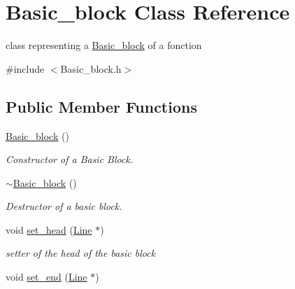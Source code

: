 \hypertarget{class_basic__block}{\section{Basic\+\_\+block Class Reference}
\label{class_basic__block}
}


class representing a \hyperlink{class_basic__block}{Basic\+\_\+block} of a fonction  




{\ttfamily \#include $<$Basic\+\_\+block.\+h$>$}

\subsection*{Public Member Functions}
\begin{DoxyCompactItemize}
\item 
\hypertarget{class_basic__block_aa2455e1b1b8f5ac9b1c128f121fe3d67}{\hyperlink{class_basic__block_aa2455e1b1b8f5ac9b1c128f121fe3d67}{Basic\+\_\+block} ()}\label{class_basic__block_aa2455e1b1b8f5ac9b1c128f121fe3d67}

\begin{DoxyCompactList}\small\item\em Constructor of a Basic Block. \end{DoxyCompactList}\item 
\hypertarget{class_basic__block_a0047b58d9a30fa6eb79a87c70e9176d0}{\hyperlink{class_basic__block_a0047b58d9a30fa6eb79a87c70e9176d0}{$\sim$\+Basic\+\_\+block} ()}\label{class_basic__block_a0047b58d9a30fa6eb79a87c70e9176d0}

\begin{DoxyCompactList}\small\item\em Destructor of a basic block. \end{DoxyCompactList}\item 
\hypertarget{class_basic__block_a26c28c6f2fcd17afa65bf04e0ed75513}{void \hyperlink{class_basic__block_a26c28c6f2fcd17afa65bf04e0ed75513}{set\+\_\+head} (\hyperlink{class_line}{Line} $\ast$)}\label{class_basic__block_a26c28c6f2fcd17afa65bf04e0ed75513}

\begin{DoxyCompactList}\small\item\em setter of the head of the basic block \end{DoxyCompactList}\item 
\hypertarget{class_basic__block_ac43e4501aaa36135c87e03c00d9911ef}{void \hyperlink{class_basic__block_ac43e4501aaa36135c87e03c00d9911ef}{set\+\_\+end} (\hyperlink{class_line}{Line} $\ast$)}\label{class_basic__block_ac43e4501aaa36135c87e03c00d9911ef}


\end{DoxyCompactItemize}
